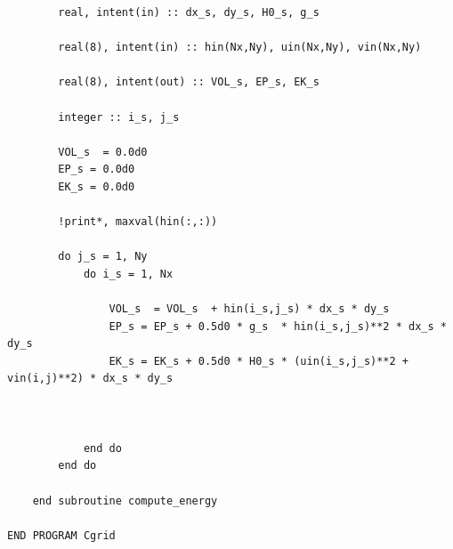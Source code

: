 \begin{verbatim}
        real, intent(in) :: dx_s, dy_s, H0_s, g_s

        real(8), intent(in) :: hin(Nx,Ny), uin(Nx,Ny), vin(Nx,Ny)

        real(8), intent(out) :: VOL_s, EP_s, EK_s

        integer :: i_s, j_s

        VOL_s  = 0.0d0
        EP_s = 0.0d0
        EK_s = 0.0d0

        !print*, maxval(hin(:,:))
        
        do j_s = 1, Ny
            do i_s = 1, Nx

                VOL_s  = VOL_s  + hin(i_s,j_s) * dx_s * dy_s
                EP_s = EP_s + 0.5d0 * g_s  * hin(i_s,j_s)**2 * dx_s * dy_s
                EK_s = EK_s + 0.5d0 * H0_s * (uin(i_s,j_s)**2 + vin(i,j)**2) * dx_s * dy_s



            end do
        end do

    end subroutine compute_energy

END PROGRAM Cgrid
\end{verbatim}
\label{code}